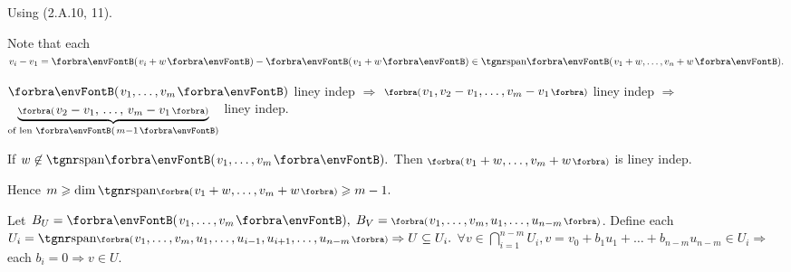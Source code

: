 
\SepLine

Using (2.A.10, 11).\par\quad
Note that each $v_i-v_1=\Par{v_i+w}-\Par{v_1+w}\in\Span{v_1+w,\dots,v_n+w}.$\par\quad
$\Par{v_1,\dots,v_m}$ liney indep $\Rightarrow$ $\BigPar{v_1,v_2-v_1,\dots,v_m-v_1}$ liney indep $\Rightarrow$ $\underbrace{\BigPar{v_2-v_1,\,\dots,\,v_m-v_1}}_{\text{of len }\SmallPar{m-1}}$ liney indep.\vspace{-15pt}\par\quad
\又 If $w\not\in\Span{v_1,\dots,v_m}.$ Then $\BigPar{v_1+w,\dots,v_m+w}$ is liney indep.\par\quad
Hence $m\geqslant\dim\Span[\BigPar]{v_1+w,\dots,v_m+w}\geqslant m-1.$\PfEnd
\SepLine

Let $B_U=\Par{v_1,\dots,v_m},\;B_V=\BigPar{v_1,\dots,v_m,u_1,\dots,u_{n-m}}$.\parSol{}
Define each $U_i=\Span[\BigPar]{v_1,\dots,v_m,u_1,\dots,u_{i-1},u_{i+1},\dots,u_{n-m}}\Rightarrow U\subseteq U_i.$\parSol{}
$\forall v\in \bigcap_{i=1}^{n-m}U_i,v=v_0+b_1 u_1+\dots+b_{n-m} u_{n-m}\in U_i\Rightarrow$ each $b_i=0\Rightarrow v\in U.$\PfEnd
\SepLine

